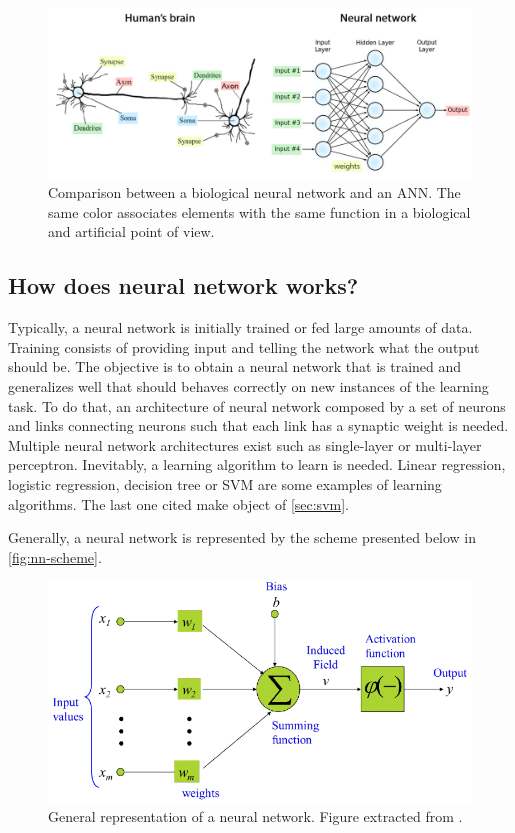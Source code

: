 \documentclass[11pt, openany]{report}
\theoremstyle{plain}
\theoremstyle{definition}
\theoremstyle{remark}
\begin{document}
\begin{figure}[h]
  \centering
  \includegraphics[scale=0.25]{figures/brainVSneuralnet.png}
  \caption{Comparison between a biological neural network and an ANN. The same color associates elements with the same function in a biological and artificial point of view.}
  \label{fig:bio-ANN}
\end{figure}

\subsection{How does neural network works?} \label{sec:nn-work}
Typically, a neural network is initially trained or fed large amounts of data. Training consists of providing input and telling the network what the output should be. The objective is to obtain a neural network that is trained and generalizes well that should behaves correctly on new instances of the learning task. To do that, an architecture of neural network composed by a set of neurons and links connecting neurons such that each link has a synaptic weight is needed. Multiple neural network architectures exist such as single-layer or multi-layer perceptron. Inevitably, a learning algorithm to learn is needed. Linear regression, logistic regression, decision tree or SVM are some examples of learning algorithms. The last one cited make object of \autoref{sec:svm}. 

Generally, a neural network is represented by the scheme presented below in \autoref{fig:nn-scheme}.

\begin{figure}[h]
  \centering
  \includegraphics[scale=0.7]{figures/nn-scheme.png}
  \caption{General representation of a neural network. Figure extracted from \cite{neuralnet-course-1}.}
  \label{fig:nn-scheme}
\end{figure}
\end{document}
